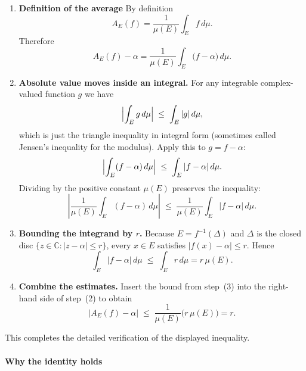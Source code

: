 \documentclass[12pt]{article}
\theoremstyle{definition} %
\theoremstyle{plain} %
\begin{document}
\begin{enumerate}
    \item \textbf{Definition of the average}  
          By definition
          \[
              A_{E}(f)
              =\frac{1}{\mu(E)}\int_{E}f\,d\mu .
          \]
          Therefore
          \[
              A_{E}(f)-\alpha
              =\frac{1}{\mu(E)}\int_{E}\bigl(f-\alpha\bigr)\,d\mu .
          \]

    \item \textbf{Absolute value moves inside an integral.}  
          For any integrable complex-valued function $g$ we have
          \[
              \Bigl|\int_{E}g\,d\mu\Bigr|
              \;\le\;
              \int_{E}|g|\,d\mu ,
          \]
          which is just the triangle inequality in integral form
          (sometimes called Jensen’s inequality for the modulus).
          Apply this to $g=f-\alpha$:
          \[
              \Bigl| \int_{E}(f-\alpha)\,d\mu \Bigr|
              \;\le\;
              \int_{E}|f-\alpha|\,d\mu .
          \]
          Dividing by the positive constant $\mu(E)$ preserves the inequality:
          \[
              \left|
                \frac{1}{\mu(E)}\int_{E}(f-\alpha)\,d\mu
              \right|
              \;\le\;
              \frac{1}{\mu(E)}\int_{E}|f-\alpha|\,d\mu .
          \]

    \item \textbf{Bounding the integrand by \(r\).}  
          Because $E=f^{-1}(\Delta)$ and $\Delta$ is the closed disc
          \(\{z\in\mathbb{C}:|z-\alpha|\le r\}\),
          every $x\in E$ satisfies
          \(|f(x)-\alpha|\le r\).
          Hence
          \[
              \int_{E}|f-\alpha|\,d\mu
              \;\le\;
              \int_{E} r\,d\mu
              = r\,\mu(E).
          \]

    \item \textbf{Combine the estimates.}  
          Insert the bound from step~(3) into the right-hand side of
          step~(2) to obtain
          \[
              \bigl|A_{E}(f)-\alpha\bigr|
              \;\le\;
              \frac{1}{\mu(E)} \bigl(r\,\mu(E)\bigr)
              = r.
          \]
\end{enumerate}

This completes the detailed verification of the displayed inequality.
\pagebreak
\paragraph{Why the identity holds}
\end{document}
